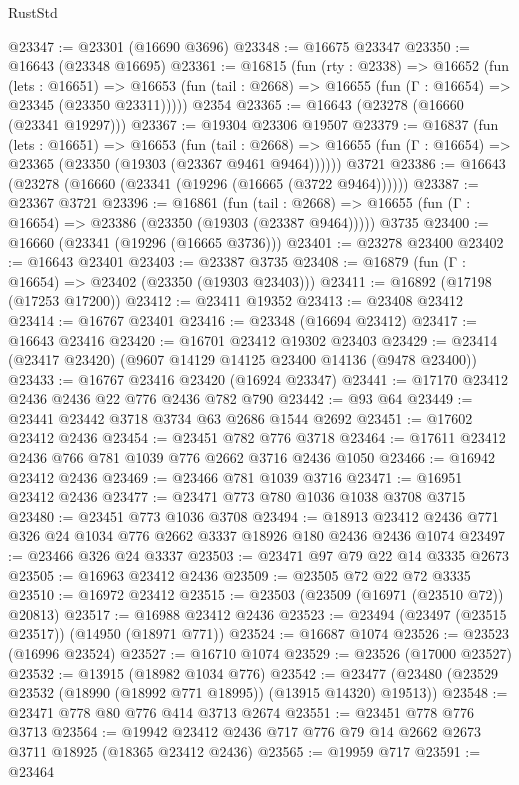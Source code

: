 \begin{lexlean}{RustStd}
\begin{coremodule}
@23347 := @23301 (@16690 @3696)
@23348 := @16675 @23347
@23350 := @16643 (@23348 @16695)
@23361 := @16815
    (fun (rty : @2338) =>
    @16652
      (fun (lets : @16651) =>
      @16653 (fun (tail : @2668) => @16655 (fun (Γ : @16654) => @23345 (@23350 @23311)))))
    @2354
@23365 := @16643 (@23278 (@16660 (@23341 @19297)))
@23367 := @19304 @23306 @19507
@23379 := @16837
    (fun (lets : @16651) =>
    @16653
      (fun (tail : @2668) =>
      @16655 (fun (Γ : @16654) => @23365 (@23350 (@19303 (@23367 @9461 @9464))))))
    @3721
@23386 := @16643 (@23278 (@16660 (@23341 (@19296 (@16665 (@3722 @9464))))))
@23387 := @23367 @3721
@23396 := @16861
    (fun (tail : @2668) => @16655 (fun (Γ : @16654) => @23386 (@23350 (@19303 (@23387 @9464)))))
    @3735
@23400 := @16660 (@23341 (@19296 (@16665 @3736)))
@23401 := @23278 @23400
@23402 := @16643 @23401
@23403 := @23387 @3735
@23408 := @16879 (fun (Γ : @16654) => @23402 (@23350 (@19303 @23403)))
@23411 := @16892 (@17198 (@17253 @17200))
@23412 := @23411 @19352
@23413 := @23408 @23412
@23414 := @16767 @23401
@23416 := @23348 (@16694 @23412)
@23417 := @16643 @23416
@23420 := @16701 @23412 @19302 @23403
@23429 := @23414 (@23417 @23420) (@9607 @14129 @14125 @23400 @14136 (@9478 @23400))
@23433 := @16767 @23416 @23420 (@16924 @23347)
@23441 := @17170 @23412 @2436 @2436 @22 @776 @2436 @782 @790
@23442 := @93 @64
@23449 := @23441 @23442 @3718 @3734 @63 @2686 @1544 @2692
@23451 := @17602 @23412 @2436
@23454 := @23451 @782 @776 @3718
@23464 := @17611 @23412 @2436 @766 @781 @1039 @776 @2662 @3716 @2436 @1050
@23466 := @16942 @23412 @2436
@23469 := @23466 @781 @1039 @3716
@23471 := @16951 @23412 @2436
@23477 := @23471 @773 @780 @1036 @1038 @3708 @3715
@23480 := @23451 @773 @1036 @3708
@23494 := @18913 @23412 @2436 @771 @326 @24 @1034 @776 @2662 @3337 @18926 @180 @2436 @2436 @1074
@23497 := @23466 @326 @24 @3337
@23503 := @23471 @97 @79 @22 @14 @3335 @2673
@23505 := @16963 @23412 @2436
@23509 := @23505 @72 @22 @72 @3335
@23510 := @16972 @23412
@23515 := @23503 (@23509 (@16971 (@23510 @72)) @20813)
@23517 := @16988 @23412 @2436
@23523 := @23494 (@23497 (@23515 @23517)) (@14950 (@18971 @771))
@23524 := @16687 @1074
@23526 := @23523 (@16996 @23524)
@23527 := @16710 @1074
@23529 := @23526 (@17000 @23527)
@23532 := @13915 (@18982 @1034 @776)
@23542 := @23477 (@23480 (@23529 @23532 (@18990 (@18992 @771 @18995)) (@13915 @14320) @19513))
@23548 := @23471 @778 @80 @776 @414 @3713 @2674
@23551 := @23451 @778 @776 @3713
@23564 := @19942 @23412 @2436 @717 @776 @79 @14 @2662 @2673 @3711 @18925 (@18365 @23412 @2436)
@23565 := @19959 @717
@23591 := @23464

\end{coremodule}
\end{lexlean}
